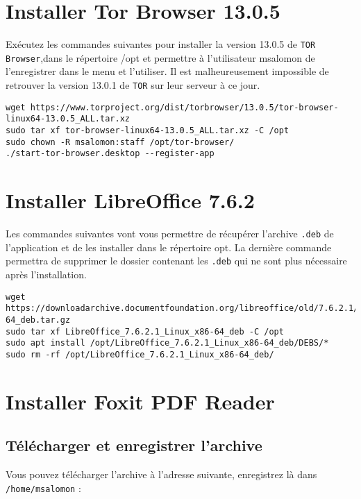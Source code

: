 \section{Installer Tor Browser 13.0.5}

Exécutez les commandes suivantes pour installer la version 13.0.5 de \texttt{TOR Browser},dans le répertoire /opt et permettre à l'utilisateur msalomon de l'enregistrer dans le menu et l'utiliser. Il est malheureusement impossible de retrouver la version 13.0.1 de \texttt{TOR} sur leur serveur à ce jour.

\begin{lstlisting}
wget https://www.torproject.org/dist/torbrowser/13.0.5/tor-browser-linux64-13.0.5_ALL.tar.xz
sudo tar xf tor-browser-linux64-13.0.5_ALL.tar.xz -C /opt
sudo chown -R msalomon:staff /opt/tor-browser/
./start-tor-browser.desktop --register-app
\end{lstlisting}

\section{Installer LibreOffice 7.6.2}

Les commandes suivantes vont vous permettre de récupérer l'archive \texttt{.deb} de l'application et de les installer dans le répertoire opt. La dernière commande permettra de supprimer le dossier contenant les \texttt{.deb} qui ne sont plus nécessaire après l'installation.

\begin{lstlisting}
wget https://downloadarchive.documentfoundation.org/libreoffice/old/7.6.2.1/deb/x86_64/LibreOffice_7.6.2.1_Linux_x86-64_deb.tar.gz
sudo tar xf LibreOffice_7.6.2.1_Linux_x86-64_deb -C /opt
sudo apt install /opt/LibreOffice_7.6.2.1_Linux_x86-64_deb/DEBS/*
sudo rm -rf /opt/LibreOffice_7.6.2.1_Linux_x86-64_deb/
\end{lstlisting}

\section{Installer Foxit PDF Reader}

\subsection{Télécharger et enregistrer l'archive}

Vous pouvez télécharger l'archive à l'adresse suivante, enregistrez là dans \texttt{/home/msalomon} :

